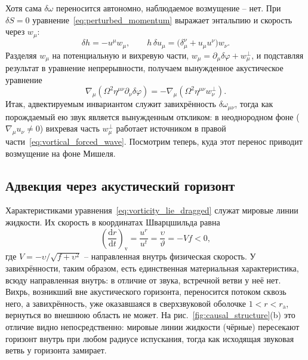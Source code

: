 \documentclass[12pt,a4paper,preprint,nopreprintline]{elsarticle}
\begin{document}
Хотя сама $\delta\omega$ переносится автономно, наблюдаемое возмущение -- нет. При $\delta S=0$ уравнение~\eqref{eq:perturbed_momentum} выражает энтальпию и скорость через $w_{\mu}$:
\begin{equation}
    \delta h
    =
    -u^{\mu}w_{\mu},
    \qquad
    h\,\delta u_{\mu}
    =
    \bigl(\delta_{\mu}^{\nu}+u_{\mu}u^{\nu}\bigr)w_{\nu}.
    \label{eq:vortical_enthalpy_velocity}
\end{equation}
Разделяя $w_{\mu}$ на потенциальную и вихревую части, $w_{\mu}=\partial_{\mu}\delta\varphi+w_{\mu}^{\perp}$, и подставляя результат в уравнение непрерывности, получаем вынужденное акустическое уравнение
\begin{equation}
    \nabla_{\mu}
    \left(
        \Omega^{2}\eta^{\mu\nu}
        \partial_{\nu}\delta\varphi
    \right)
    =
    -
    \nabla_{\mu}
    \left(
        \Omega^{2}\eta^{\mu\nu}w_{\nu}^{\perp}
    \right).
    \label{eq:vortical_forced_wave}
\end{equation}
Итак, адвектируемым инвариантом служит завихрённость $\delta\omega_{\mu\nu}$, тогда как порождаемый ею звук является вынужденным откликом: в неоднородном фоне ($\nabla_{\mu}u_{\nu}\neq0$) вихревая часть $w_{\mu}^{\perp}$ работает источником в правой части~\eqref{eq:vortical_forced_wave}. Посмотрим теперь, куда этот перенос приводит возмущение на фоне Мишеля.

\subsection{Адвекция через акустический горизонт}
\label{sec:vortical_transport}

Характеристиками уравнения~\eqref{eq:vorticity_lie_dragged} служат мировые линии жидкости. Их скорость в координатах Шварцшильда равна
\begin{equation}
    \left(\frac{\mathrm{d}r}{\mathrm{d}t}\right)_{\mathrm{v}}
    =
    \frac{u^{r}}{u^{t}}
    =
    \frac{\upsilon}{\vartheta}
    =
    -Vf<0,
    \label{eq:vortex_characteristic}
\end{equation}
где $V=-\upsilon/\sqrt{f+\upsilon^{2}}$ -- направленная внутрь физическая скорость. У завихрённости, таким образом, есть единственная материальная характеристика, всюду направленная внутрь: в отличие от звука, встречной ветви у неё нет. Вихрь, возникший вне акустического горизонта, переносится потоком сквозь него, а завихрённость, уже оказавшаяся в сверхзвуковой оболочке $1<r<r_{\mathrm{a}}$, вернуться во внешнюю область не может. На рис.~\ref{fig:causal_structure}(b) это отличие видно непосредственно: мировые линии жидкости (чёрные) пересекают горизонт внутрь при любом радиусе испускания, тогда как исходящая звуковая ветвь у горизонта замирает.
\end{document}
